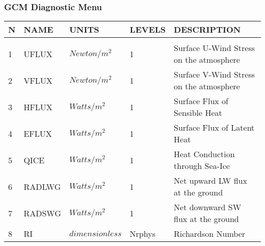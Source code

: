 \subsubsection{GCM Diagnostic Menu}
\label{sec:diagnostics:menu}

\begin{tabular}{lllll}
\hline\hline
N & NAME & UNITS & LEVELS & DESCRIPTION \\
\hline

&\\
1 & UFLUX    &   $Newton/m^2$  &    1  
         &\begin{minipage}[t]{3in}
          {Surface U-Wind Stress on the atmosphere}
         \end{minipage}\\
2 & VFLUX    &   $Newton/m^2$  &    1  
         &\begin{minipage}[t]{3in}
          {Surface V-Wind Stress on the atmosphere}
         \end{minipage}\\
3 & HFLUX    &   $Watts/m^2$  &    1  
         &\begin{minipage}[t]{3in}
          {Surface Flux of Sensible Heat}
         \end{minipage}\\
4 & EFLUX    &   $Watts/m^2$  &    1  
         &\begin{minipage}[t]{3in}
          {Surface Flux of Latent Heat}
         \end{minipage}\\
5 & QICE     &   $Watts/m^2$  &    1  
         &\begin{minipage}[t]{3in}
          {Heat Conduction through Sea-Ice}
         \end{minipage}\\
6 & RADLWG   &   $Watts/m^2$ &    1  
         &\begin{minipage}[t]{3in}
          {Net upward LW flux at the ground}
         \end{minipage}\\
7 & RADSWG   &   $Watts/m^2$  &    1 
         &\begin{minipage}[t]{3in}
          {Net downward SW flux at the ground} 
         \end{minipage}\\
8 & RI       &  $dimensionless$ &  Nrphys 
         &\begin{minipage}[t]{3in}
          {Richardson Number}
         \end{minipage}\\

\end{tabular}
